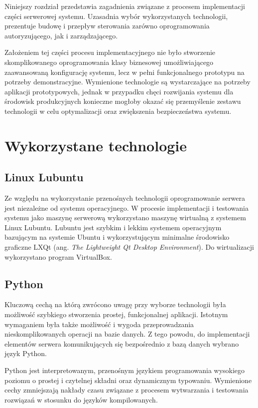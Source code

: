 \label{chap:server}

    Niniejszy rozdział przedstawia zagadnienia związane z procesem implementacji części serwerowej systemu. Uzasadnia wybór wykorzystanych technologii, prezentuje budowę i przepływ sterowania zarówno oprogramowania autoryzującego, jak i zarządzającego.

    Założeniem tej części procesu implementacyjnego nie było stworzenie skomplikowanego oprogramowania klasy biznesowej umożliwiającego zaawansowaną konfigurację systemu, lecz w pełni funkcjonalnego prototypu na potrzeby demonstracyjne. Wymienione technologie są wystarczające na potrzeby aplikacji prototypowych, jednak w przypadku chęci rozwijania systemu dla środowisk produkcyjnych konieczne mogłoby okazać się przemyślenie zestawu technologii w celu optymalizacji oraz zwiększenia bezpieczeństwa systemu.

    \section{Wykorzystane technologie}

    	\subsection{Linux Lubuntu}

    		Ze względu na wykorzystanie przenośnych technologii oprogramowanie serwera jest niezależne od systemu operacyjnego. W procesie implementacji i testowania systemu jako maszynę serwerową wykorzystano maszynę wirtualną z systemem Linux Lubuntu. Lubuntu jest szybkim i lekkim systemem operacyjnym bazującym na systemie Ubuntu i wykorzystującym minimalne środowisko graficzne LXQt (ang. \textit{The Lightweight Qt Desktop Environment}). Do wirtualizacji wykorzystano program VirtualBox.
    	
    	\subsection{Python}

    		Kluczową cechą na którą zwrócono uwagę przy wyborze technologii była możliwość szybkiego stworzenia prostej, funkcjonalnej aplikacji. Istotnym wymaganiem była także możliwość i wygoda przeprowadzania nieskomplikowanych operacji na bazie danych. Z tego powodu, do implementacji elementów serwera komunikujących się bezpośrednio z bazą danych wybrano język Python.

    		Python jest interpretowanym, przenośnym językiem programowania wysokiego poziomu o prostej i czytelnej składni oraz dynamicznym typowaniu. Wymienione cechy zmniejszają nakłady czasu związane z procesem wytwarzania i testowania rozwiązań w stosunku do języków kompilowanych.

